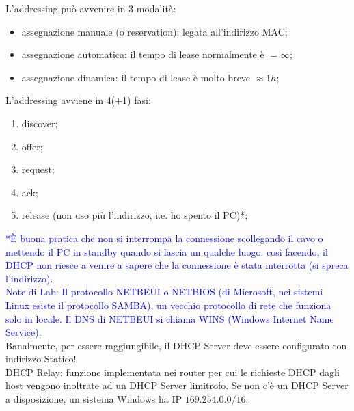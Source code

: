\noindent L'addressing può avvenire in 3 modalità:
\begin{itemize}
    \item assegnazione manuale (o reservation): legata all'indirizzo MAC;
    \item assegnazione automatica: il tempo di lease normalmente è $=\infty$;
    \item assegnazione dinamica: il tempo di lease è molto breve $\approx 1h$;
\end{itemize}

\noindent L'addressing avviene in 4(+1) fasi:
\begin{enumerate}
    \item discover;
    \item offer;
    \item request;
    \item ack;
    \item release (non uso più l'indirizzo, i.e. ho spento il PC)*;
\end{enumerate}
\noindent \textcolor{Blue}{*È buona pratica che non si interrompa la connessione scollegando il cavo o mettendo il PC in standby quando si lascia un qualche luogo: così facendo, il DHCP non riesce a venire a sapere che la connessione è stata interrotta (si spreca l'indirizzo).}\\

\noindent {}\textcolor{Blue}{Note di Lab: Il protocollo NETBEUI o NETBIOS (di Microsoft, nei sistemi Linux esiste il protocollo SAMBA), un vecchio protocollo di rete che funziona solo in locale. Il DNS di NETBEUI si chiama WINS (Windows Internet Name Service).}\\

\noindent Banalmente, per essere raggiungibile, il DHCP Server deve essere configurato con indirizzo Statico!\\

\noindent {}DHCP Relay: funzione implementata nei router per cui le richieste DHCP dagli host vengono inoltrate ad un DHCP Server limitrofo. Se non c'è un DHCP Server a disposizione, un sistema Windows ha IP $169.254.0.0/16$.
